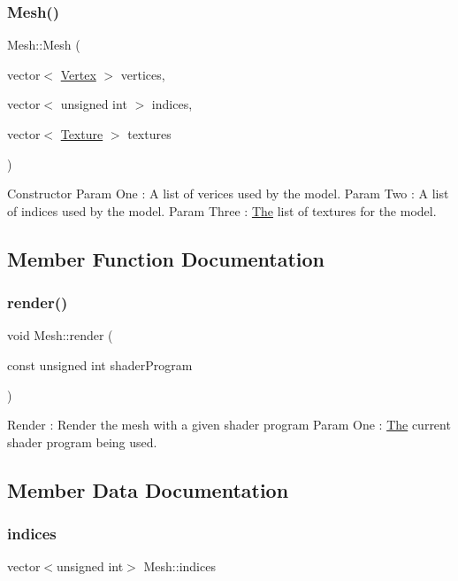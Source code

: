 \subsubsection{\texorpdfstring{Mesh()}{Mesh()}}
{\footnotesize\ttfamily Mesh\+::\+Mesh (\begin{DoxyParamCaption}\item[{vector$<$ \mbox{\hyperlink{struct_vertex}{Vertex}} $>$}]{vertices,  }\item[{vector$<$ unsigned int $>$}]{indices,  }\item[{vector$<$ \mbox{\hyperlink{struct_texture}{Texture}} $>$}]{textures }\end{DoxyParamCaption})}

Constructor Param One \+: A list of verices used by the model. Param Two \+: A list of indices used by the model. Param Three \+: \mbox{\hyperlink{class_the}{The}} list of textures for the model. 

\subsection{Member Function Documentation}
\mbox{\label{class_mesh_a9a6ec018bec776cb7b31fb8433c8a7e7}} 
\subsubsection{\texorpdfstring{render()}{render()}}
{\footnotesize\ttfamily void Mesh\+::render (\begin{DoxyParamCaption}\item[{const unsigned int}]{shader\+Program }\end{DoxyParamCaption})}

Render \+: Render the mesh with a given shader program Param One \+: \mbox{\hyperlink{class_the}{The}} current shader program being used. 

\subsection{Member Data Documentation}
\mbox{\label{class_mesh_a464d9a1d7e7a4f67321dffc1e8b44b7d}} 
\subsubsection{\texorpdfstring{indices}{indices}}
{\footnotesize\ttfamily vector$<$unsigned int$>$ Mesh\+::indices}

